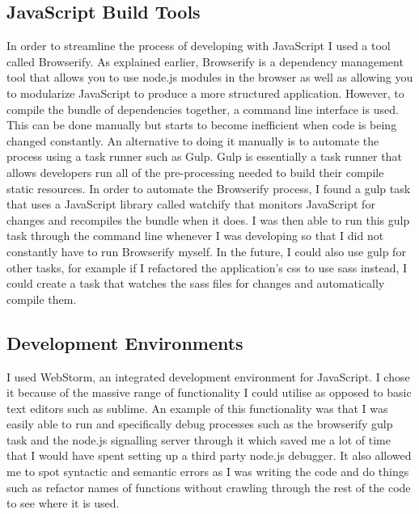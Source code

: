 \documentclass[]{report}
\begin{document}
			\subsection{JavaScript Build Tools}
			In order to streamline the process of developing with JavaScript I used a tool called Browserify. As explained earlier, Browserify is a dependency management tool that allows you to use node.js modules in the browser as well as allowing you to modularize JavaScript to produce a more structured application. However, to compile the bundle of dependencies together, a command line interface is used. This can be done manually but starts to become inefficient when code is being changed constantly. An alternative to doing it manually is to automate the process using a task runner such as Gulp. Gulp is essentially a task runner that allows developers run all of the pre-processing needed to build their compile static resources. In order to automate the Browserify process, I found a gulp task that uses a JavaScript library called watchify that monitors JavaScript for changes and recompiles the bundle when it does. I was then able to run this gulp task through the command line whenever I was developing so that I did not constantly have to run Browserify myself. In the future, I could also use gulp for other tasks, for example if I refactored the application's css to use sass instead, I could create a task that watches the sass files for changes and automatically compile them.
			
			\subsection{Development Environments}
			I used WebStorm, an integrated development environment for JavaScript. I chose it because of the massive range of functionality I could utilise as opposed to basic text editors such as sublime. An example of this functionality was that I was easily able to run and specifically debug processes such as the browserify gulp task and the node.js signalling server through it which saved me a lot of time that I would have spent setting up a third party node.js debugger. It also allowed me to spot syntactic and semantic errors as I was writing the code and do things such as refactor names of functions without crawling through the rest of the code to see where it is used.
			
\end{document}
